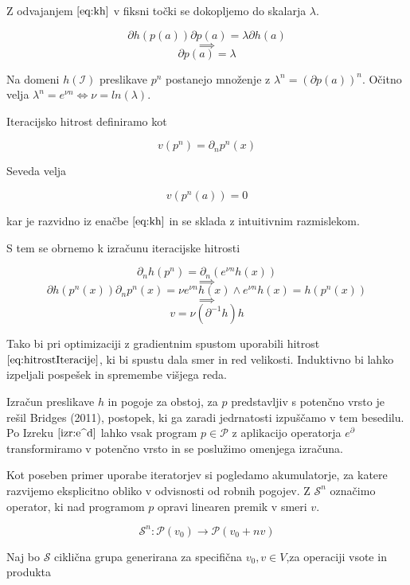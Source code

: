 \documentclass{article}
\newcommand{\Shift}{\mathcal{S}}
\newcommand{\dP}{\mathcal{P}}
\newcommand{\D}{\partial}
\begin{document}
  Z odvajanjem $\eqref{eq:kh}$ v fiksni točki se dokopljemo do skalarja $\lambda$.
  
  $$\D h(p(a))\D p(a)=\lambda\D h(a)$$
  $$\implies$$
  $$\D p(a)=\lambda$$
  
  Na domeni $h(\mathcal{I})$ preslikave $p^n$ postanejo množenje z $\lambda^n=(\D p(a))^n$. Očitno velja $\lambda^n=e^{\nu n}\iff \nu=ln(\lambda)$.
  
  Iteracijsko hitrost definiramo kot
  
  \begin{equation}
  v(p^n)=\D_np^n(x)
  \end{equation}
  
  Seveda velja
  
  \begin{equation}
  v(p^n(a))=0
  \end{equation}
  
  kar je razvidno iz enačbe $\eqref{eq:kh}$ in se sklada z intuitivnim razmislekom.
  
  S tem se obrnemo k izračunu iteracijske hitrosti
 
  $$\D_nh(p^n)=\D_n(e^{\nu n}h(x))$$
  $$\implies$$
  $$\D h(p^n(x))\D_np^n(x)=\nu e^{\nu n}h(x) \land e^{\nu n}h(x)=h(p^n(x))$$
  $$\implies$$
  \begin{equation}\label{eq:hitrostIteracije}
  v=\nu(\D^{-1}h)h
  \end{equation}
  
  Tako bi pri optimizaciji z gradientnim spustom uporabili hitrost $\eqref{eq:hitrostIteracije}$, ki bi spustu dala smer in red velikosti. Induktivno bi lahko izpeljali pospešek in spremembe višjega reda.
  
  Izračun preslikave $h$ in pogoje za obstoj, za $p$ predstavljiv s potenčno vrsto je rešil Bridges (2011), postopek, ki ga zaradi jedrnatosti izpuščamo v tem besedilu. Po Izreku $\eqref{izr:e^d}$ lahko vsak program $p\in\dP$ z aplikacijo operatorja $e^\D$ transformiramo v potenčno vrsto in se poslužimo omenjega izračuna.
  
   Kot poseben primer uporabe iteratorjev si pogledamo akumulatorje, za katere razvijemo eksplicitno obliko v odvisnosti od robnih pogojev. Z $\Shift^n$ označimo operator, ki nad programom $p$ opravi linearen premik v smeri $v$.
   
   \begin{equation}
   \Shift^n:\dP(v_0)\to \dP(v_0+nv)
   \end{equation}
    
    Naj bo $\Shift$ ciklična grupa generirana za specifična $v_0,v\in V$,za operaciji vsote in produkta
   
\end{document}
